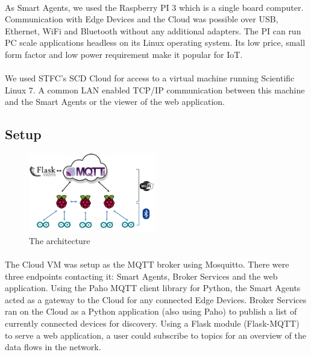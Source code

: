 \paragraph{}
As Smart Agents, we used the Raspberry PI 3 which is a single board computer. Communication with Edge Devices and the Cloud was possible over USB, Ethernet, WiFi and Bluetooth without any additional adapters. The PI can run PC scale applications headless on its Linux operating system. Its low price, small form factor and low power requirement make it popular for IoT.

\paragraph{}
We used STFC's SCD Cloud for access to a virtual machine running Scientific Linux 7. A common LAN enabled TCP/IP communication between this machine and the Smart Agents or the viewer of the web application.


\subsection{Setup}

\begin{figure}
    \centering
    \includegraphics[width=0.5\textwidth]{Architecture.png}
    \caption{The architecture}
    \label{fig:architecture}
\end{figure}

\paragraph{}
The Cloud VM was setup as the MQTT broker using Mosquitto. There were three endpoints contacting it: Smart Agents, Broker Services and the web application. Using the Paho MQTT client library for Python, the Smart Agents acted as a gateway to the Cloud for any connected Edge Devices. Broker Services ran on the Cloud as a Python application (also using Paho) to publish a list of currently connected devices for discovery. Using a Flask module (Flask-MQTT) to serve a web application, a user could subscribe to topics for an overview of the data flows in the network.


